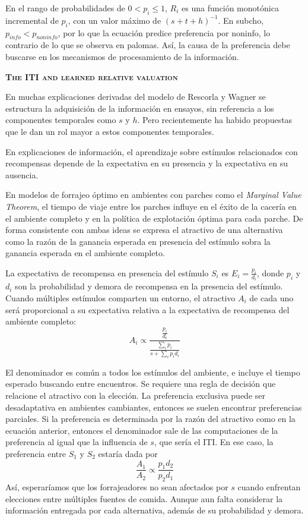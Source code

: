 \documentclass[a4paper,12pt]{article}
\begin{document}
En el rango de probabilidades de $0 < p_i \leq 1$, $R_i$ es una función monotónica incremental de $p_i$, con un valor máximo de $(s+t+h)^{-1}$. En subcho, $p_{info} < p_{noninfo}$, por lo que la ecuación predice preferencia por noninfo, lo contrario de lo que se observa en palomas. Así, la causa de la preferencia debe buscarse en los mecanismos de procesamiento de la información.

{\scshape\bfseries The ITI and learned relative valuation}

En muchas explicaciones derivadas del modelo de Rescorla y Wagner se estructura la adquisición de la información en ensayos, sin referencia a los componentes temporales como $s$ y $h$. Pero recientemente ha habido propuestas que le dan un rol mayor a estos componentes temporales.

En explicaciones de información, el aprendizaje sobre estímulos relacionados con recompensas depende de la expectativa en su presencia y la expectativa en su ausencia. 

En modelos de forrajeo óptimo en ambientes con parches como el {\itshape Marginal Value Theorem}, el tiempo de viaje entre los parches influye en el éxito de la cacería en el ambiente completo y en la política de explotación óptima para cada parche. De forma consistente con ambas ideas se expresa el atractivo de una alternativa como la razón de la ganancia esperada en presencia del estímulo sobra la ganancia esperada en el ambiente completo.

La expectativa de recompensa en presencia del estímulo $S_i$ es $E_i = \frac{p_i}{d_i}$, donde $p_i$ y $d_i$ son la probabilidad y demora de recompensa en la presencia del estímulo. Cuando múltiples estímulos comparten un entorno, el atractivo $A_i$ de cada uno será proporcional a su expectativa relativa a la expectativa de recompensa del ambiente completo:
\begin{equation}
A_i \propto \frac{\frac{p_i}{d_i}}{\frac{\sum_ip_i}{s+\sum_ip_id_i}}
\end{equation}

El denominador es común a todos los estímulos del ambiente, e incluye el tiempo esperado buscando entre encuentros. Se requiere una regla de decisión que relacione el atractivo con la elección. La preferencia exclusiva puede ser desadaptativa en ambientes cambiantes, entonces se suelen encontrar preferencias parciales. Si la preferencia es determinada por la razón del atractivo como en la ecuación anterior, entonces el denominador sale de las computaciones de la preferencia al igual que la influencia de $s$, que sería el ITI. En ese caso, la preferencia entre $S_1$ y $S_2$ estaría dada por
\begin{equation}
\frac{A_1}{A_2}\propto \frac{p_1d_2}{p_2d_1}
\end{equation}
Así, esperaríamos que los forrajeadores no sean afectados por $s$ cuando enfrentan elecciones entre múltiples fuentes de comida. Aunque aun falta considerar la información entregada por cada alternativa, además de su probabilidad y demora.
\end{document}
